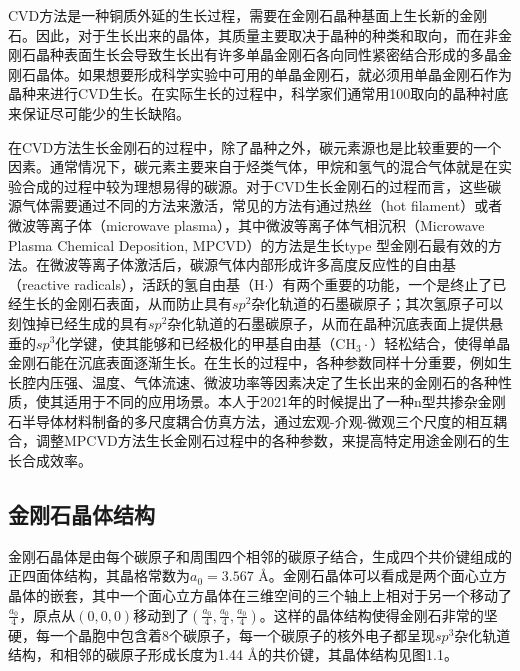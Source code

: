 \documentclass[type = bachelor]{whu-thesis}
\begin{document}
CVD方法是一种铜质外延的生长过程，需要在金刚石晶种基面上生长新的金刚石\cite{isberg2002high,isberg2002high}。因此，对于生长出来的晶体，其质量主要取决于晶种的种类和取向，而在非金刚石晶种表面生长会导致生长出有许多单晶金刚石各向同性紧密结合形成的多晶金刚石晶体\cite{mildren2013optical, jahnke2012long}。如果想要形成科学实验中可用的单晶金刚石，就必须用单晶金刚石作为晶种来进行CVD生长。在实际生长的过程中，科学家们通常用{100}取向的晶种衬底来保证尽可能少的生长缺陷\cite{gicquel2001cvd}。

在CVD方法生长金刚石的过程中，除了晶种之外，碳元素源也是比较重要的一个因素。通常情况下，碳元素主要来自于烃类气体，甲烷和氢气的混合气体就是在实验合成的过程中较为理想易得的碳源。对于CVD生长金刚石的过程而言，这些碳源气体需要通过不同的方法来激活，常见的方法有通过热丝（hot filament）或者微波等离子体（microwave plasma），其中微波等离子体气相沉积（Microwave Plasma Chemical Deposition, MPCVD）的方法是生长type \uppercase\expandafter{}型金刚石最有效的方法\cite{robins1990line, nemanich2014cvd}。在微波等离子体激活后，碳源气体内部形成许多高度反应性的自由基（reactive radicals），活跃的氢自由基（H$\cdot$）有两个重要的功能，一个是终止了已经生长的金刚石表面，从而防止具有$sp^2$杂化轨道的石墨碳原子；其次氢原子可以刻蚀掉已经生成的具有$sp^2$杂化轨道的石墨碳原子，从而在晶种沉底表面上提供悬垂的$sp^3$化学键，使其能够和已经极化的甲基自由基（CH$_3\cdot$）轻松结合，使得单晶金刚石能在沉底表面逐渐生长\cite{denisenko2010surface}。在生长的过程中，各种参数同样十分重要，例如生长腔内压强、温度、气体流速、微波功率等因素决定了生长出来的金刚石的各种性质，使其适用于不同的应用场景。本人于2021年的时候提出了一种n型共掺杂金刚石半导体材料制备的多尺度耦合仿真方法，通过宏观-介观-微观三个尺度的相互耦合，调整MPCVD方法生长金刚石过程中的各种参数，来提高特定用途金刚石的生长合成效率\cite{CN113096749B}。

\subsection{金刚石晶体结构}
金刚石晶体是由每个碳原子和周围四个相邻的碳原子结合，生成四个共价键组成的正四面体结构，其晶格常数为$a_0 = 3.567$ \unit{\angstrom}。金刚石晶体可以看成是两个面心立方晶体的嵌套，其中一个面心立方晶体在三维空间的三个轴上上相对于另一个移动了$\frac{a_0}{4}$，原点从$(0, 0, 0)$移动到了$(\frac{a_0}{4}, \frac{a_0}{4}, \frac{a_0}{4})$。这样的晶体结构使得金刚石非常的坚硬，每一个晶胞中包含着8个碳原子，每一个碳原子的核外电子都呈现$sp^3$杂化轨道结构，和相邻的碳原子形成长度为1.44 \unit{\angstrom}的共价键，其晶体结构见图1.1。
\end{document}
